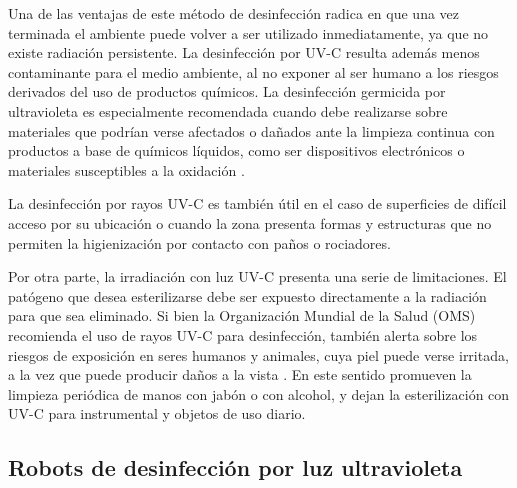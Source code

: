 Una de las ventajas de este método de desinfección radica en que una vez terminada el ambiente puede volver a ser utilizado inmediatamente, ya que no existe radiación persistente. La desinfección  por UV-C resulta además menos contaminante para el medio ambiente, al no exponer al ser humano a los riesgos derivados del uso de productos químicos. La desinfección germicida por ultravioleta es especialmente recomendada cuando debe realizarse sobre materiales que podrían verse afectados o dañados ante la limpieza continua con productos a base de químicos líquidos, como ser dispositivos electrónicos o materiales susceptibles a la  oxidación \citep{interior}. 
%



La desinfección por rayos UV-C es también útil en el caso de superficies de difícil acceso por su ubicación o cuando la zona presenta formas y estructuras que no permiten la higienización por contacto con paños o rociadores. 

Por otra parte, la irradiación con luz UV-C presenta una serie de limitaciones. El patógeno que desea esterilizarse debe ser  expuesto directamente a la radiación para que sea eliminado. Si bien la Organización Mundial de la Salud (OMS) recomienda el uso de rayos UV-C para desinfección, también alerta sobre los riesgos de  exposición en seres humanos y animales, cuya piel puede verse irritada, a la vez que puede producir daños a la vista \citep{MYTH}. En este sentido promueven la limpieza periódica de manos con jabón o con alcohol, y dejan la esterilización con UV-C para  instrumental y objetos de uso diario.






\subsection{Robots de desinfección por luz ultravioleta}


